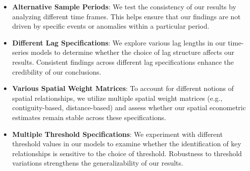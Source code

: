 \begin{itemize}
\setlength{\itemsep}{0pt}  %
\item \textbf{Alternative Sample Periods}: We test the consistency of our results by analyzing different time frames. This helps ensure that our findings are not driven by specific events or anomalies within a particular period.

\item \textbf{Different Lag Specifications}: We explore various lag lengths in our time-series models to determine whether the choice of lag structure affects our results. Consistent findings across different lag specifications enhance the credibility of our conclusions.

\item \textbf{Various Spatial Weight Matrices}: To account for different notions of spatial relationships, we utilize multiple spatial weight matrices (e.g., contiguity-based, distance-based) and assess whether our spatial econometric estimates remain stable across these specifications.

\item \textbf{Multiple Threshold Specifications}: We experiment with different threshold values in our models to examine whether the identification of key relationships is sensitive to the choice of threshold. Robustness to threshold variations strengthens the generalizability of our results.
\end{itemize}

